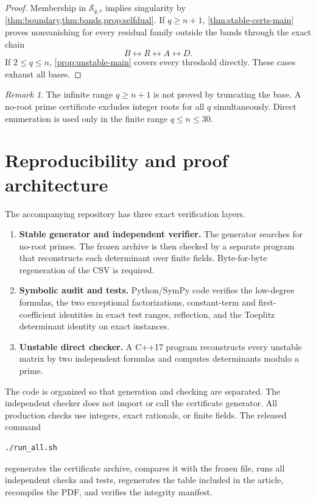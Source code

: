 \documentclass[11pt]{amsart}
\newcommand{\Sing}{\mathcal S}
\newcommand{\1}{\mathbf 1}
\theoremstyle{remark}
\newtheorem{remark}[theorem]{Remark}
\begin{document}
\begin{proof}
Membership in $\Sing_{q,r}$ implies singularity by \cref{thm:boundary,thm:bands,prop:selfdual}. If $q\ge n+1$, \cref{thm:stable-certs-main} proves nonvanishing for every residual family outside the bands through the exact chain
\[
 B\longleftrightarrow R\longleftrightarrow A\longleftrightarrow D.
\]
If $2\le q\le n$, \cref{prop:unstable-main} covers every threshold directly. These cases exhaust all bases.
\end{proof}

\begin{remark}
The infinite range $q\ge n+1$ is not proved by truncating the base. A no-root prime certificate excludes integer roots for all $q$ simultaneously. Direct enumeration is used only in the finite range $q\le n\le30$.
\end{remark}

\section{Reproducibility and proof architecture}
\label{sec:reproducibility}

The accompanying repository has three exact verification layers.

\begin{enumerate}[label=(\arabic*)]
\item \textbf{Stable generator and independent verifier.} The generator searches for no-root primes. The frozen archive is then checked by a separate program that reconstructs each determinant over finite fields. Byte-for-byte regeneration of the CSV is required.
\item \textbf{Symbolic audit and tests.} Python/SymPy code verifies the low-degree formulas, the two exceptional factorizations, constant-term and first-coefficient identities in exact test ranges, reflection, and the Toeplitz determinant identity on exact instances.
\item \textbf{Unstable direct checker.} A C++17 program reconstructs every unstable matrix by two independent formulas and computes determinants modulo a prime.
\end{enumerate}

The code is organized so that generation and checking are separated. The independent checker does not import or call the certificate generator. All production checks use integers, exact rationals, or finite fields. The released command
\begin{verbatim}
./run_all.sh
\end{verbatim}
regenerates the certificate archive, compares it with the frozen file, runs all independent checks and tests, regenerates the table included in the article, recompiles the PDF, and verifies the integrity manifest.
\end{document}
